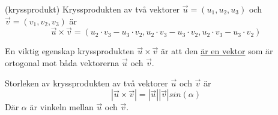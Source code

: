 \documentclass[../main.tex]{subfiles}
\begin{document}
\begin{formel}{(kryssprodukt)}
\label{kryssprod} 
Kryssprodukten av två vektorer $\vec{u} = (u_1, u_2, u_3)$ och $\vec{v} = (v_1, v_2, v_3)$ är
\[\vec{u}\times \vec{v} = (u_2\cdot v_3 - u_3\cdot v_2, u_2\cdot v_3 - u_3\cdot v_2, u_2\cdot v_3 - u_3\cdot v_2)\]

En viktig egenskap kryssprodukten $\vec{u}\times\vec{v}$ är att den \underline{är en vektor} som är ortogonal mot båda vektorerna $\vec{u}$ och $\vec{v}$.
\end{formel}


\begin{formel}
\label{kryssprodsize} 
Storleken av kryssprodukten av två vektorer $\vec{u}$ och $\vec{v}$ är
\[|\vec{u}\times \vec{v}| = |\vec{u}||\vec{v}|sin(\alpha)\]
Där $\alpha$ är vinkeln mellan $\vec{u}$ och $\vec{v}$.
\end{formel}
\end{document}
